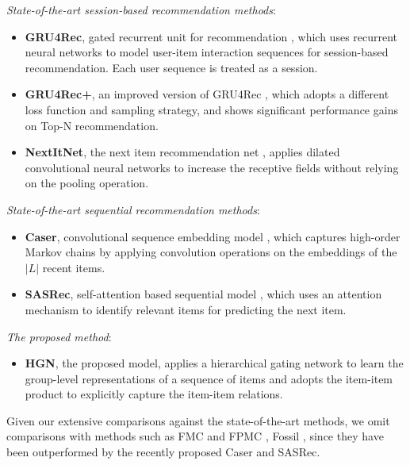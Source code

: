 \documentclass[sigconf]{acmart}
\begin{document}
\textit{State-of-the-art session-based recommendation methods}:
\begin{itemize}
\item \textbf{GRU4Rec}, gated recurrent unit for recommendation \cite{DBLP:journals/corr/HidasiKBT15}, which uses recurrent neural networks to model user-item interaction sequences for session-based recommendation. Each user sequence is treated as a session.
\item \textbf{GRU4Rec+}, an improved version of GRU4Rec \cite{DBLP:conf/cikm/HidasiK18}, which adopts a different loss function and sampling strategy, and shows significant performance gains on Top-N recommendation.
\item \textbf{NextItNet}, the next item recommendation net \cite{DBLP:conf/wsdm/YuanKAJ019}, applies dilated convolutional neural networks to increase the receptive fields without relying on the pooling operation.
\end{itemize}

\textit{State-of-the-art sequential recommendation methods}:
\begin{itemize}
\item \textbf{Caser}, convolutional sequence embedding model \cite{DBLP:conf/wsdm/TangW18}, which captures high-order Markov chains by applying convolution operations on the embeddings of the $ |L| $ recent items.
\item \textbf{SASRec}, self-attention based sequential model \cite{DBLP:conf/icdm/KangM18}, which uses an attention mechanism to identify relevant items for predicting the next item.
\end{itemize}

\textit{The proposed method}:
\begin{itemize}
\item \textbf{HGN}, the proposed model, applies a hierarchical gating network to learn the group-level representations of a sequence of items and adopts the item-item product to explicitly capture the item-item relations.
\end{itemize}

Given our extensive comparisons against the state-of-the-art methods, we omit comparisons with methods such as FMC and FPMC \cite{DBLP:conf/www/RendleFS10}, Fossil \cite{DBLP:conf/icdm/HeM16}, since they have been outperformed by the recently proposed Caser and SASRec.
\end{document}
